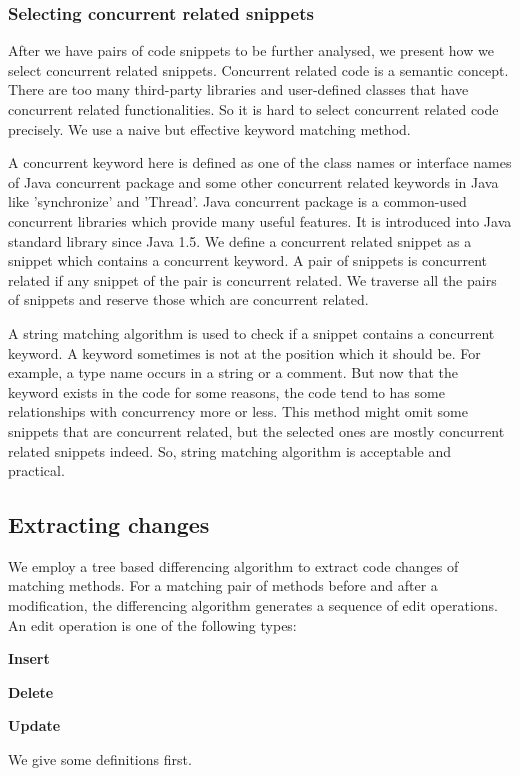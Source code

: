 \documentclass{sig-alternate-05-2015}
\begin{document}
\subsubsection{Selecting concurrent related snippets}
After we have pairs of code snippets to be further analysed, we present how we select concurrent related snippets. Concurrent related code is a semantic concept. There are too many third-party libraries and user-defined classes that have concurrent related functionalities. So it is hard to select concurrent related code precisely. We use a naive but effective keyword matching method.

A concurrent keyword here is defined as one of the class names or interface names of Java concurrent package and some other concurrent related keywords in Java like 'synchronize' and 'Thread'. Java concurrent package is a common-used concurrent libraries which provide many useful features. It is introduced into Java standard library since Java 1.5. We define a concurrent related snippet as a snippet which contains a concurrent keyword. A pair of snippets is concurrent related if any snippet of the pair is concurrent related. We traverse all the pairs of snippets and reserve those which are concurrent related.

A string matching algorithm is used to check if a snippet contains a concurrent keyword. A keyword sometimes is not at the position which it should be. For example, a type name occurs in a string or a comment. But now that the keyword exists in the code for some reasons, the code tend to has some relationships with concurrency more or less. This method might omit some snippets that are concurrent related, but the selected ones are mostly concurrent related snippets indeed. So, string matching algorithm is acceptable and practical.

\subsection{Extracting changes}
We employ a tree based differencing algorithm to extract code changes of matching methods. For a matching pair of methods before and after a modification, the differencing algorithm generates a sequence of edit operations. An edit operation is one of the following types:

\textbf{Insert}

\textbf{Delete}

\textbf{Update}

We give some definitions first.
\end{document}
